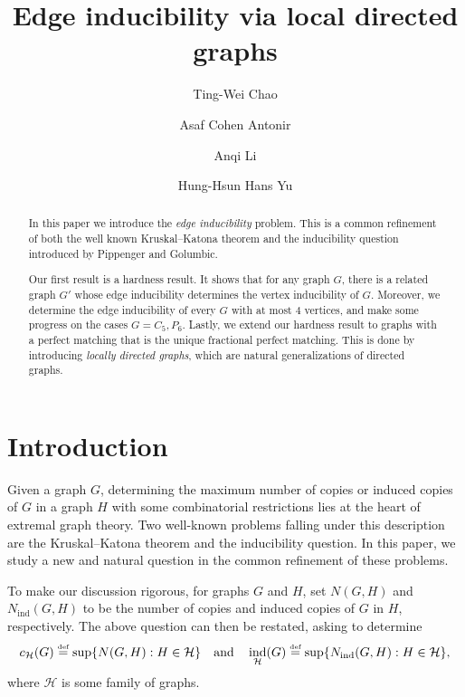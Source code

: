 \documentclass[reqno,11pt]{amsart}
\author[Ting-Wei Chao]{Ting-Wei Chao\thankssymb{1}}
\author[Asaf Cohen Antonir]{Asaf Cohen Antonir\thankssymb{3}}
\author[Anqi Li]{Anqi Li\thankssymb{4}}
\author[Hung-Hsun Hans Yu]{Hung-Hsun Hans Yu\thankssymb{2}}
\title{Edge inducibility via local directed graphs}
\numberwithin{equation}{section}
\theoremstyle{definition}
\theoremstyle{remark}
\DeclareMathOperator{\ind}{ind}
\newcommand*{\eqdef}{\stackrel{\mbox{\normalfont\tiny def}}{=}}
\begin{document}
\begin{abstract}
    In this paper we introduce the \emph{edge inducibility} problem. This is a common refinement of both the well known Kruskal--Katona theorem and the inducibility question introduced by Pippenger and Golumbic. 

    Our first result is a hardness result.
    It shows that for any graph $G$, there is a related graph $G'$ whose edge inducibility determines the vertex inducibility of $G$.
    Moreover, we determine the edge inducibility of every $G$ with at most $4$ vertices, and make some progress on the cases $G=C_5,P_6$. Lastly, we extend our hardness result to graphs with a perfect matching that is the unique fractional perfect matching. This is done by introducing \emph{locally directed graphs}, which are natural generalizations of directed graphs. 
\end{abstract}

\maketitle

\section{Introduction}

Given a graph $G$, determining the maximum number of copies or induced copies of $G$ in a graph $H$ with some combinatorial restrictions lies at the heart of extremal graph theory. Two well-known problems falling under this description are the Kruskal--Katona theorem and the inducibility question. In this paper, we study a new and natural question in the common refinement of these problems.

To make our discussion rigorous, for graphs $G$ and $H$, set $N(G, H)$ and $N_{\ind}(G, H)$ to be the number of copies and induced copies of $G$ in $H$, respectively. The above question can then be restated, asking to determine 
\[
	c_{\mathcal{H}}(G)\eqdef \sup \{N(G,H) : H\in \mathcal{H} \} \quad \text{and}\quad \ind_{\mathcal{H}}(G)\eqdef \sup\{N_{\ind}(G,H) : H\in \mathcal{H} \},
\]
where $\mathcal{H}$ is some family of graphs.
\end{document}
